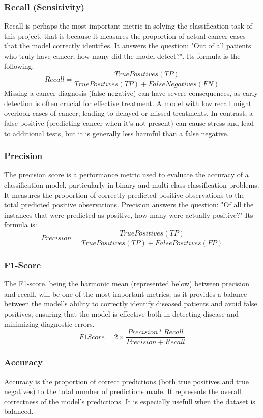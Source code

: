 \subsubsection{Recall (Sensitivity)}
Recall is perhaps the most important metric in solving the classification task of this project, that is because it measures the proportion of actual cancer cases that the model correctly identifies. It answers the question: "Out of all patients who truly have cancer, how many did the model detect?". Its formula is the following:
\[Recall=\frac{True Positives (TP)}{True Positives (TP)+False Negatives (FN)}\]
Missing a cancer diagnosis (false negative) can have severe consequences, as early detection is often crucial for effective treatment. A model with low recall might overlook cases of cancer, leading to delayed or missed treatments.
In contrast, a false positive (predicting cancer when it's not present) can cause stress and lead to additional tests, but it is generally less harmful than a false negative.

\subsubsection{Precision}
The precision score is a performance metric used to evaluate the accuracy of a classification model, particularly in binary and multi-class classification problems. It measures the proportion of correctly predicted positive observations to the total predicted positive observations. Precision answers the question: "Of all the instances that were predicted as positive, how many were actually positive?" Its formula is:
\[Precision=\frac{True Positives (TP)}{True Positives (TP)+False Positives (FP)}\]

\subsubsection{F1-Score}
The F1-score, being the harmonic mean (represented below) between precision and recall, will be one of the most important metrics, as it provides a balance between the model’s ability to correctly identify diseased patients and avoid false positives, ensuring that the model is effective both in detecting disease and minimizing diagnostic errors.
\[F1Score=2 \times \frac{Precision*Recall}{Precision+Recall}\]

\subsubsection{Accuracy}
Accuracy is the proportion of correct predictions (both true positives and true negatives) to the total number of predictions made. It represents the overall correctness of the model's predictions. It is especially usefull when the dataset is balanced.

